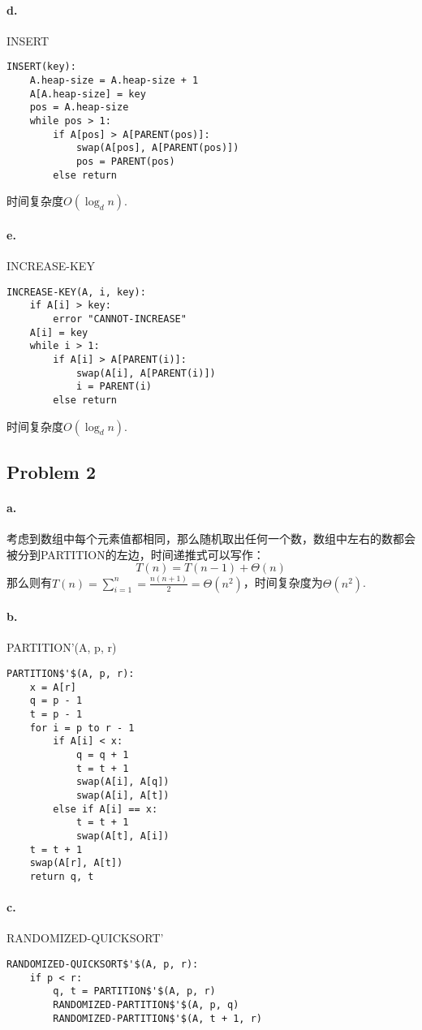 \documentclass[UTF8]{ctexart}
\begin{document}
\paragraph{d. }INSERT
\begin{lstlisting}
INSERT(key):
    A.heap-size = A.heap-size + 1
    A[A.heap-size] = key
    pos = A.heap-size
    while pos > 1:
        if A[pos] > A[PARENT(pos)]:
            swap(A[pos], A[PARENT(pos)])
            pos = PARENT(pos)
        else return
\end{lstlisting}
时间复杂度$O(\log_d n)$.

\paragraph{e. }INCREASE-KEY
\begin{lstlisting}
INCREASE-KEY(A, i, key):
    if A[i] > key:
        error "CANNOT-INCREASE"
    A[i] = key
    while i > 1:
        if A[i] > A[PARENT(i)]:
            swap(A[i], A[PARENT(i)])
            i = PARENT(i)
        else return
\end{lstlisting}
时间复杂度$O(\log_d n)$.

\subsection*{Problem 2}
\paragraph{a. }
考虑到数组中每个元素值都相同，那么随机取出任何一个数，数组中左右的数都会被分到PARTITION的左边，时间递推式可以写作：
$$T(n)=T(n-1)+\Theta(n)$$
那么则有$T(n)=\sum\limits_{i=1}^n=\frac{n(n+1)}{2}=\Theta(n^2)$，时间复杂度为$\Theta(n^2)$.

\paragraph{b. } PARTITION'(A, p, r)
\begin{lstlisting}[mathescape=true]
PARTITION$'$(A, p, r):
    x = A[r]
    q = p - 1
    t = p - 1
    for i = p to r - 1
        if A[i] < x:
            q = q + 1
            t = t + 1
            swap(A[i], A[q])
            swap(A[i], A[t])
        else if A[i] == x:
            t = t + 1
            swap(A[t], A[i])
    t = t + 1
    swap(A[r], A[t])
    return q, t
\end{lstlisting}
\paragraph{c. } RANDOMIZED-QUICKSORT'
\begin{lstlisting}[mathescape=true]
RANDOMIZED-QUICKSORT$'$(A, p, r):
    if p < r:
        q, t = PARTITION$'$(A, p, r)
        RANDOMIZED-PARTITION$'$(A, p, q)
        RANDOMIZED-PARTITION$'$(A, t + 1, r)
\end{lstlisting}
\end{document}

